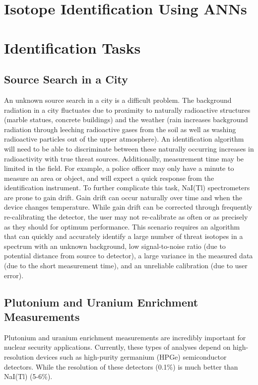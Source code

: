 \documentclass[thesis,tocnosub,noragright,centerchapter,12pt,fullpage]{uiucecethesis09}
\begin{document}
\section{Isotope Identification Using ANNs}




\section{Identification Tasks}

\subsection{Source Search in a City}
An unknown source search in a city is a difficult problem. The background radiation in a city fluctuates due to proximity to naturally radioactive structures (marble statues, concrete buildings) and the weather (rain increases background radiation through leeching radioactive gases from the soil as well as washing radioactive particles out of the upper atmosphere). An identification algorithm will need to be able to discriminate between these naturally occurring increases in radioactivity with true threat sources. Additionally, measurement time may be limited in the field. For example, a police officer may only have a minute to measure an area or object, and will expect a quick response from the identification instrument. To further complicate this task, NaI(Tl) spectrometers are prone to gain drift. Gain drift can occur naturally over time and when the device changes temperature. While gain drift can be corrected through frequently re-calibrating the detector, the user may not re-calibrate as often or as precisely as they should for optimum performance. This scenario requires an algorithm that can quickly and accurately identify a large number of threat isotopes in a spectrum with an unknown background, low signal-to-noise ratio (due to potential distance from source to detector), a large variance in the measured data (due to the short measurement time), and an unreliable calibration (due to user error).

\subsection{Plutonium and Uranium Enrichment Measurements}


Plutonium and uranium enrichment measurements are incredibly important for nuclear security applications. Currently, these types of analyses depend on high-resolution devices such as high-purity germanium (HPGe) semiconductor detectors. While the resolution of these detectors (0.1\%) is much better than NaI(Tl) (5-6\%).
\end{document}
